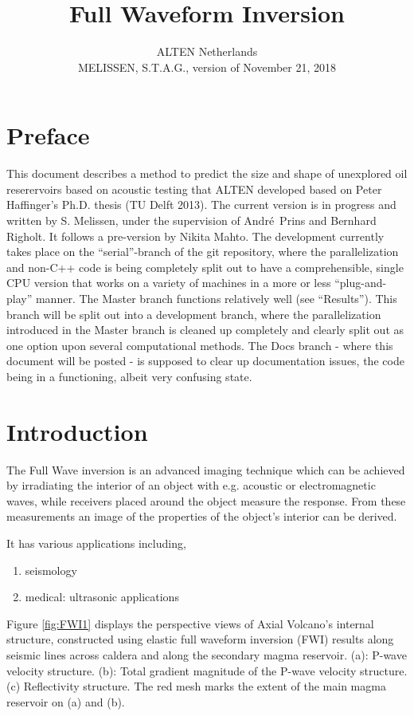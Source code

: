 \documentclass[10pt,a4paper]{article}
\title{Full Waveform Inversion}
\author{ALTEN Netherlands\\
MELISSEN, S.T.A.G., version of November 21, 2018}
\begin{document}
\maketitle
\newpage
\tableofcontents
\newpage
\section{Preface}
This document describes a method to predict the size and shape of unexplored oil reserervoirs based on acoustic testing that ALTEN developed based on Peter Haffinger's Ph.D. thesis (TU Delft 2013).
The current version is in progress and written by S. Melissen, under the supervision of Andr\'e\ Prins and Bernhard Righolt.
It follows a pre-version by Nikita Mahto.
The development currently takes place on the ``serial''-branch of the git repository, where the parallelization and non-C++ code is being completely split out to have a comprehensible, single CPU version that works on a variety of machines in a more or less ``plug-and-play'' manner.
The Master branch functions relatively well (see ``Results'').
This branch will be split out into a development branch, where the parallelization introduced in the Master branch is cleaned up completely and clearly split out as one option upon several computational methods.
The Docs branch - where this document will be posted - is supposed to clear up documentation issues, the code being in a functioning, albeit very confusing state.

\newpage
\clearpage
\section{Introduction}

The Full Wave inversion is an advanced imaging
technique which can be achieved by
irradiating the interior of
an object with e.g. acoustic or electromagnetic
waves, while receivers placed around the object measure the response.
From these measurements an image of the properties of the object's
interior can be derived.

It has various applications including,

\begin{enumerate}
    \item seismology
    \item medical: ultrasonic applications
\end{enumerate}

Figure \ref{fig:FWI1} displays the perspective views of Axial
Volcano’s internal structure, constructed using elastic full waveform
inversion (FWI) results along seismic lines across caldera and along
the secondary magma reservoir. (a): P-wave velocity structure. (b):
Total gradient magnitude of the P-wave velocity structure. (c)
Reflectivity structure. The red mesh marks the extent of the main
magma reservoir on (a) and (b).
\end{document}
